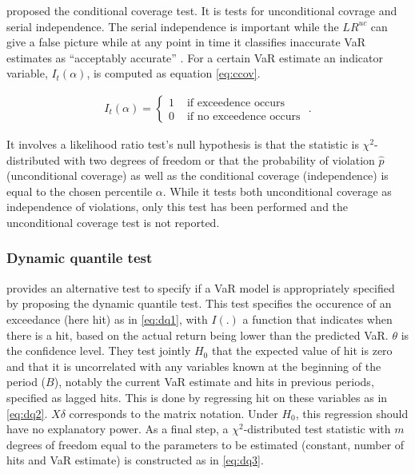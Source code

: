\documentclass[a4paper, nobind]{templates/ociamthesis}
\begin{document}
\noindent \textcite{christoffersen2001} proposed the conditional coverage test. It is tests for unconditional covrage and serial independence. The serial independence is important while the \(L R^{u c}\) can give a false picture while at any point in time it classifies inaccurate VaR estimates as ``acceptably accurate'' \autocite{bali2007}. For a certain VaR estimate an indicator variable, \(I_t(\alpha)\), is computed as equation \eqref{eq:ccov}.

\begin{align}
I_{t}(\alpha)=\left\{\begin{array}{ll}
1 & \text { if exceedence occurs } \\
0 & \text { if no exceedence occurs }
\end{array} .\right.
\label{eq:ccov}
\end{align}

\noindent It involves a likelihood ratio test's null hypothesis is that the statistic is \(\chi^2\)-distributed with two degrees of freedom or that the probability of violation \(\hat p\) (unconditional coverage) as well as the conditional coverage (independence) is equal to the chosen percentile \(\alpha\). While it tests both unconditional coverage as independence of violations, only this test has been performed and the unconditional coverage test is not reported.

\hypertarget{dynamic-quantile-test}{%
\subsubsection{Dynamic quantile test}\label{dynamic-quantile-test}}

\noindent \textcite{engle2004} provides an alternative test to specify if a VaR model is appropriately specified by proposing the dynamic quantile test. This test specifies the occurence of an exceedance (here hit) as in \eqref{eq:dq1}, with \(I(.)\) a function that indicates when there is a hit, based on the actual return being lower than the predicted VaR. \(\theta\) is the confidence level. They test jointly \(H_0\) that the expected value of hit is zero and that it is uncorrelated with any variables known at the beginning of the period (\(B\)), notably the current VaR estimate and hits in previous periods, specified as lagged hits. This is done by regressing hit on these variables as in \eqref{eq:dq2}. \(X\delta\) corresponds to the matrix notation. Under \(H_0\), this regression should have no explanatory power. As a final step, a \(\chi^2\)-distributed test statistic with \(m\) degrees of freedom equal to the parameters to be estimated (constant, number of hits and VaR estimate) is constructed as in \eqref{eq:dq3}.
\end{document}
